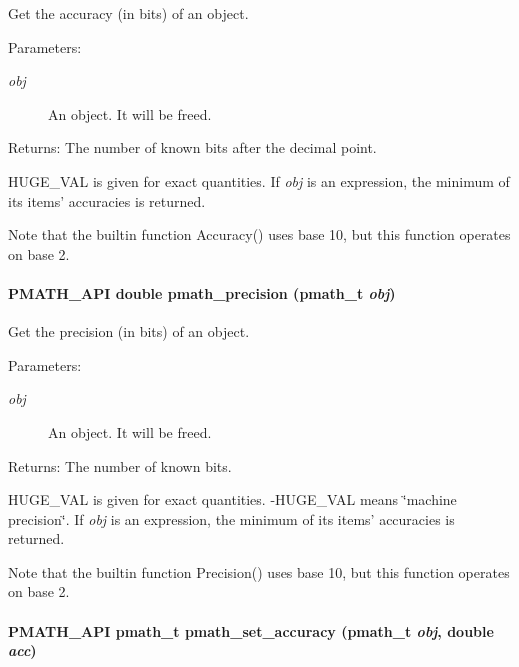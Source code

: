 Get the accuracy (in bits) of an object. 

\begin{Desc}
\item[Parameters:]
\begin{description}
\item[{\em obj}]An object. It will be freed. \end{description}
\end{Desc}
\begin{Desc}
\item[Returns:]The number of known bits after the decimal point.\end{Desc}
HUGE\_\-VAL is given for exact quantities. If {\em obj\/} is an expression, the minimum of its items' accuracies is returned.

Note that the builtin function Accuracy() uses base 10, but this function operates on base 2. \hypertarget{group__numbers_g8c708b70a1cb0904900187f0c149ab7b}{
\paragraph[{pmath\_\-precision}]{\setlength{\rightskip}{0pt plus 5cm}PMATH\_\-API double pmath\_\-precision ({\bf pmath\_\-t} {\em obj})}\hfill}
\label{group__numbers_g8c708b70a1cb0904900187f0c149ab7b}


Get the precision (in bits) of an object. 

\begin{Desc}
\item[Parameters:]
\begin{description}
\item[{\em obj}]An object. It will be freed. \end{description}
\end{Desc}
\begin{Desc}
\item[Returns:]The number of known bits.\end{Desc}
HUGE\_\-VAL is given for exact quantities. -HUGE\_\-VAL means \char`\"{}machine precision\char`\"{}. If {\em obj\/} is an expression, the minimum of its items' accuracies is returned.

Note that the builtin function Precision() uses base 10, but this function operates on base 2. \hypertarget{group__numbers_g58e3c6cb9f505bb6c4544dd54de719f0}{
\paragraph[{pmath\_\-set\_\-accuracy}]{\setlength{\rightskip}{0pt plus 5cm}PMATH\_\-API {\bf pmath\_\-t} pmath\_\-set\_\-accuracy ({\bf pmath\_\-t} {\em obj}, \/  double {\em acc})}\hfill}
\label{group__numbers_g58e3c6cb9f505bb6c4544dd54de719f0}


